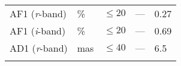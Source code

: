 \documentclass[DM,toc]{lsstdoc}
\begin{document}
\begin{longtable}[]{@{}lllll@{}}
\begin{minipage}[t]{0.19\columnwidth}\raggedright\strut
AF1 (\emph{r}-band)\strut
\end{minipage} & \begin{minipage}[t]{0.08\columnwidth}\raggedright\strut
\%\strut
\end{minipage} & \begin{minipage}[t]{0.20\columnwidth}\raggedright\strut
\(\leq 20\)\strut
\end{minipage} & \begin{minipage}[t]{0.22\columnwidth}\raggedright\strut
---\strut
\end{minipage} & \begin{minipage}[t]{0.17\columnwidth}\raggedright\strut
0.27\strut
\end{minipage}\tabularnewline
\begin{minipage}[t]{0.19\columnwidth}\raggedright\strut
AF1 (\emph{i}-band)\strut
\end{minipage} & \begin{minipage}[t]{0.08\columnwidth}\raggedright\strut
\%\strut
\end{minipage} & \begin{minipage}[t]{0.20\columnwidth}\raggedright\strut
\(\leq 20\)\strut
\end{minipage} & \begin{minipage}[t]{0.22\columnwidth}\raggedright\strut
---\strut
\end{minipage} & \begin{minipage}[t]{0.17\columnwidth}\raggedright\strut
0.69\strut
\end{minipage}\tabularnewline
\begin{minipage}[t]{0.19\columnwidth}\raggedright\strut
AD1 (\emph{r}-band)\strut
\end{minipage} & \begin{minipage}[t]{0.08\columnwidth}\raggedright\strut
mas\strut
\end{minipage} & \begin{minipage}[t]{0.20\columnwidth}\raggedright\strut
\(\leq 40\)\strut
\end{minipage} & \begin{minipage}[t]{0.22\columnwidth}\raggedright\strut
---\strut
\end{minipage} & \begin{minipage}[t]{0.17\columnwidth}\raggedright\strut
6.5\strut
\end{minipage}\tabularnewline
\begin{minipage}[t]{0.19\columnwidth}\raggedright\strut

\end{minipage}
\end{longtable}
\end{document}
